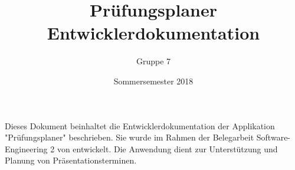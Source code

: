 \documentclass{scrartcl}
\begin{document}
	\title{Prüfungsplaner \\ Entwicklerdokumentation}
	\author{Gruppe 7}
	\date{Sommersemester 2018}
	\maketitle
	
	Dieses Dokument beinhaltet die Entwicklerdokumentation der Applikation "Prüfungsplaner" beschrieben. Sie wurde im Rahmen der Belegarbeit Software-Engineering 2 von entwickelt. Die Anwendung dient zur Unterstützung und Planung von Präsentationsterminen.
	
	\tableofcontents
	
  
\end{document}
